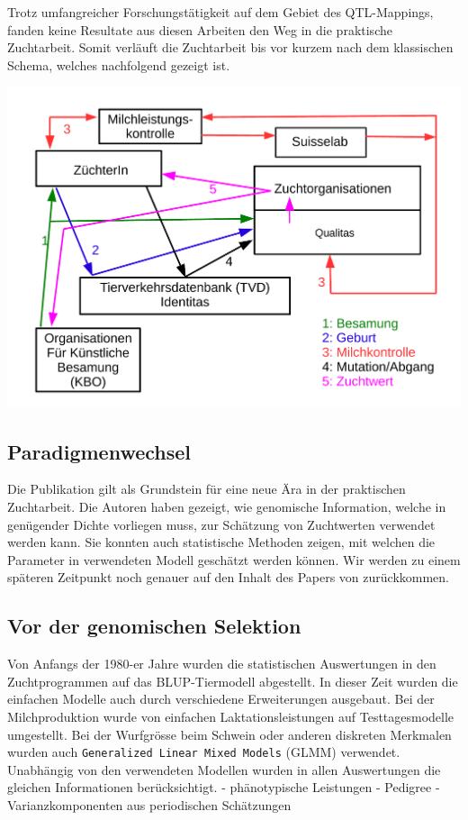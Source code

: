 \documentclass[]{book}
\begin{document}
Trotz umfangreicher Forschungstätigkeit auf dem Gebiet des QTL-Mappings,
fanden keine Resultate aus diesen Arbeiten den Weg in die praktische
Zuchtarbeit. Somit verläuft die Zuchtarbeit bis vor kurzem nach dem
klassischen Schema, welches nachfolgend gezeigt ist.

\begin{center}\includegraphics{ZuchtprogrammKomplett} \end{center}

\subsection{Paradigmenwechsel}\label{paradigmenwechsel}

Die Publikation \citep{MHG2001} gilt als Grundstein für eine neue Ära in
der praktischen Zuchtarbeit. Die Autoren haben gezeigt, wie genomische
Information, welche in genügender Dichte vorliegen muss, zur Schätzung
von Zuchtwerten verwendet werden kann. Sie konnten auch statistische
Methoden zeigen, mit welchen die Parameter in verwendeten Modell
geschätzt werden können. Wir werden zu einem späteren Zeitpunkt noch
genauer auf den Inhalt des Papers von \citep{MHG2001} zurückkommen.

\subsection{Vor der genomischen
Selektion}\label{vor-der-genomischen-selektion}

Von Anfangs der 1980-er Jahre wurden die statistischen Auswertungen in
den Zuchtprogrammen auf das BLUP-Tiermodell abgestellt. In dieser Zeit
wurden die einfachen Modelle auch durch verschiedene Erweiterungen
ausgebaut. Bei der Milchproduktion wurde von einfachen
Laktationsleistungen auf Testtagesmodelle umgestellt. Bei der Wurfgrösse
beim Schwein oder anderen diskreten Merkmalen wurden auch
\texttt{Generalized\ Linear\ Mixed\ Models} (GLMM) verwendet. Unabhängig
von den verwendeten Modellen wurden in allen Auswertungen die gleichen
Informationen berücksichtigt. - phänotypische Leistungen - Pedigree -
Varianzkomponenten aus periodischen Schätzungen
\end{document}
